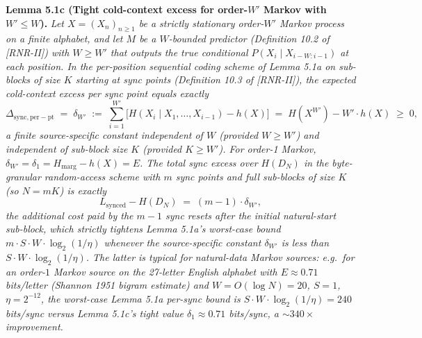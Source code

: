 \documentclass[
]{article}
\begin{document}
\textbf{Lemma 5.1c (Tight cold-context excess for order-$W'$ Markov
with $W' \leq W$).} \emph{Let $X = (X_n)_{n \geq 1}$ be a strictly
stationary order-$W'$ Markov process on a finite alphabet, and let
$M$ be a $W$-bounded predictor (Definition 10.2 of [RNR-II]) with $W \geq W'$
that outputs the true conditional $P(X_i \mid X_{i-W:i-1})$ at each
position. In the per-position sequential coding scheme of Lemma 5.1a
on sub-blocks of size $K$ starting at sync points (Definition 10.3 of [RNR-II]),
the expected cold-context excess per sync point equals exactly}
\[
\Delta_{\mathrm{sync, per-pt}}
\;=\; \delta_{W'}
\;:=\; \sum_{i=1}^{W'} \bigl[ H(X_i \mid X_1, \ldots, X_{i-1}) - h(X) \bigr]
\;=\; H(X^{W'}) - W' \cdot h(X)
\;\geq\; 0,
\tag{5.9}
\]
\emph{a finite source-specific constant independent of $W$ (provided
$W \geq W'$) and independent of sub-block size $K$ (provided
$K \geq W'$). For order-1 Markov, $\delta_{W'} = \delta_1 =
H_{\mathrm{marg}} - h(X) = E$. The
total sync \emph{excess over $H(D_N)$} in the byte-granular
random-access scheme with $m$ sync points and full sub-blocks of
size $K$ (so $N = m K$) is exactly}
\[
L_{\mathrm{synced}} - H(D_N) \;=\; (m - 1) \cdot \delta_{W'},
\]
\emph{the additional cost paid by the $m-1$ sync resets after the
initial natural-start sub-block, which strictly tightens Lemma 5.1a's
worst-case bound $m \cdot S \cdot W \cdot \log_2(1/\eta)$ whenever
the source-specific constant $\delta_{W'}$ is less than
$S \cdot W \cdot \log_2(1/\eta)$. The latter is typical for
natural-data Markov sources: e.g.\ for an order-$1$ Markov source on
the 27-letter English alphabet with $E \approx 0.71$ bits/letter
(Shannon 1951 bigram estimate) and $W = O(\log N) = 20$, $S = 1$,
$\eta = 2^{-12}$, the worst-case Lemma 5.1a per-sync bound is
$S \cdot W \cdot \log_2(1/\eta) = 240$ bits/sync versus Lemma 5.1c's
tight value $\delta_1 \approx 0.71$ bits/sync, a $\sim 340\times$
improvement.}
\end{document}
